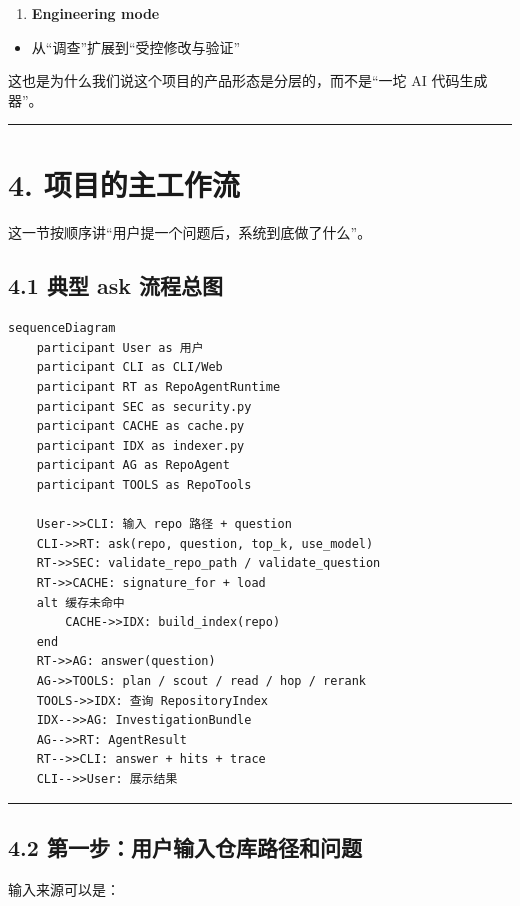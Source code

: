 \documentclass[UTF8,12pt,openany]{ctexbook}
\begin{document}
\begin{enumerate}
\item \textbf{Engineering mode}
\end{enumerate}
\begin{itemize}
\item 从“调查”扩展到“受控修改与验证”
\end{itemize}

这也是为什么我们说这个项目的产品形态是分层的，而不是“一坨 AI 代码生成器”。\par

\hrule

\section{4. 项目的主工作流}

这一节按顺序讲“用户提一个问题后，系统到底做了什么”。\par

\subsection{4.1 典型 ask 流程总图}

\begin{lstlisting}
sequenceDiagram
    participant User as 用户
    participant CLI as CLI/Web
    participant RT as RepoAgentRuntime
    participant SEC as security.py
    participant CACHE as cache.py
    participant IDX as indexer.py
    participant AG as RepoAgent
    participant TOOLS as RepoTools

    User->>CLI: 输入 repo 路径 + question
    CLI->>RT: ask(repo, question, top_k, use_model)
    RT->>SEC: validate_repo_path / validate_question
    RT->>CACHE: signature_for + load
    alt 缓存未命中
        CACHE->>IDX: build_index(repo)
    end
    RT->>AG: answer(question)
    AG->>TOOLS: plan / scout / read / hop / rerank
    TOOLS->>IDX: 查询 RepositoryIndex
    IDX-->>AG: InvestigationBundle
    AG-->>RT: AgentResult
    RT-->>CLI: answer + hits + trace
    CLI-->>User: 展示结果
\end{lstlisting}

\hrule

\subsection{4.2 第一步：用户输入仓库路径和问题}

输入来源可以是：\par
\end{document}
